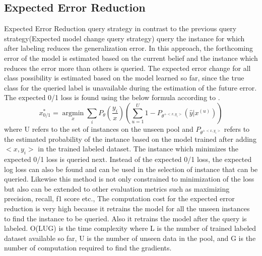 \subsection{Expected Error Reduction}
Expected Error Reduction query strategy in contrast to the previous query strategy(Expected model change query strategy) query the instance for which after labeling reduces the generalization error.  In this approach, the forthcoming error of the model is estimated based on the current belief and the instance which reduces the error more than others is queried.  The expected error change for all class possibility is estimated based on the model learned so far, since the true class for the queried label is unavailable during the estimation of the future error. The expected 0/1 loss is found using the below formula according to \cite{Settles2010}.
\begin{equation}  
x^*_{0/1} = \operatorname*{argmin}_x \sum_{i} P_{\theta}(\frac{y_i}{x})(\sum_{u=1}^{U} 1 - P_{\theta^{+<x,y_i>}}(\hat{y}|x^{(u)}))
\end{equation} 
where U refers to the set of instances on the unseen pool and $P_{\theta^{+<x,y_i>}}$ refers to the estimated probability of the instance based on the model trained after adding $<x,y_i>$ in the trained labeled dataset. The instance which minimizes the expected 0/1 loss is queried next. Instead of the expected 0/1 loss, the expected log loss can also be found and can be used in the selection of instance that can be queried. Likewise this method is not only constrained to minimization of the loss but also can be extended  to other  evaluation metrics such as maximizing precision, recall, f1 score etc., The computation cost for the expected error reduction is very high because it retrains the model for all the unseen instances to find the instance to be queried. Also it retrains the model after the query is labeled.  O(LUG) is the time complexity where L is the number of trained labeled dataset available so far, U is the number of unseen data in the pool, and G is the number of computation required to find the gradients. \cite{Settles2010}

